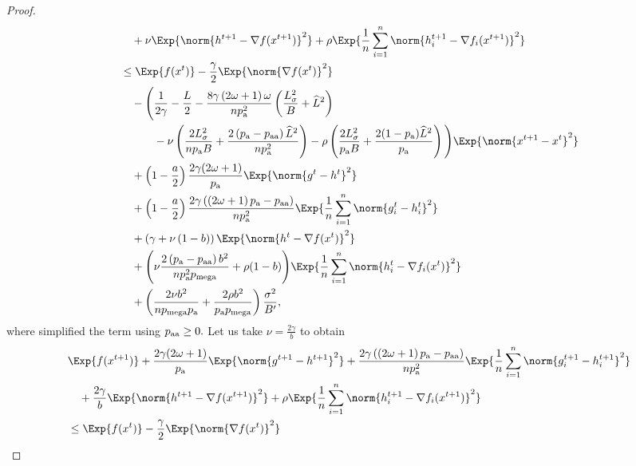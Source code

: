 \documentclass{article}
\newcommand*{\probavailable}{\ensuremath{p_{\textnormal{a}}}}
\newcommand*{\probpairaa}{\ensuremath{p_{\textnormal{aa}}}}
\newcommand*{\probmega}{\ensuremath{p_{\text{mega}}}}
\begin{document}
\begin{proof}
\begin{align*}
    &\quad  + \nu \Exp{\norm{h^{t+1} - \nabla f(x^{t+1})}^2} + \rho \Exp{\frac{1}{n}\sum_{i=1}^n\norm{h^{t+1}_i - \nabla f_i(x^{t+1})}^2}\\
    &\leq \Exp{f(x^t)} - \frac{\gamma}{2}\Exp{\norm{\nabla f(x^t)}^2} \\
    &\quad - \Bigg(\frac{1}{2\gamma} - \frac{L}{2} - \frac{8 \gamma \left(2 \omega + 1\right)\omega}{n \probavailable^2}\left(\frac{L_{\sigma}^2}{B} + \widehat{L}^2\right) \\
    &\qquad\quad - \nu \left(\frac{2 L_{\sigma}^2}{n \probavailable B} + \frac{2\left(\probavailable - \probpairaa\right) \widehat{L}^2}{n \probavailable^2}\right) - \rho \left(\frac{2 L_{\sigma}^2}{\probavailable B} + \frac{2(1 - \probavailable) \widehat{L}^2}{\probavailable}\right)\Bigg) \Exp{\norm{x^{t+1} - x^t}^2} \\
    &\quad + \left(1 - \frac{a}{2}\right)\frac{2\gamma(2\omega + 1)}{\probavailable} \Exp{\norm{g^{t} - h^{t}}^2} \\
    &\quad + \left(1 - \frac{a}{2}\right)\frac{2\gamma\left(\left(2 \omega + 1\right)\probavailable - \probpairaa\right)}{n \probavailable^2}\Exp{\frac{1}{n}\sum_{i=1}^n\norm{g^{t}_i - h^{t}_i}^2} \\
    &\quad + \left(\gamma + \nu \left(1 - b\right)\right) \Exp{\norm{h^{t} - \nabla f(x^{t})}^2} \\
    &\quad + \Bigg(\nu \frac{2\left(\probavailable - \probpairaa\right) b^2}{n \probavailable^2 \probmega} + \rho (1 - b)\Bigg)\Exp{\frac{1}{n}\sum_{i=1}^n\norm{h^{t}_i - \nabla f_i(x^{t})}^2} \\
    &\quad + \left(\frac{2 \nu b^2}{n \probmega \probavailable} + \frac{2 \rho b^2}{\probavailable \probmega}\right) \frac{\sigma^2}{B'},
  \end{align*}
  where simplified the term using $\probpairaa \geq 0.$ Let us take $\nu = \frac{2\gamma}{b}$ to obtain
  \begin{align*}
    &\Exp{f(x^{t + 1})} + \frac{2\gamma(2\omega + 1)}{\probavailable} \Exp{\norm{g^{t+1} - h^{t+1}}^2} + \frac{2\gamma\left(\left(2 \omega + 1\right)\probavailable - \probpairaa\right)}{n \probavailable^2} \Exp{\frac{1}{n}\sum_{i=1}^n\norm{g^{t+1}_i - h^{t+1}_i}^2}\\
    &\quad  + \frac{2\gamma}{b} \Exp{\norm{h^{t+1} - \nabla f(x^{t+1})}^2} + \rho \Exp{\frac{1}{n}\sum_{i=1}^n\norm{h^{t+1}_i - \nabla f_i(x^{t+1})}^2}\\
    &\leq \Exp{f(x^t)} - \frac{\gamma}{2}\Exp{\norm{\nabla f(x^t)}^2} \\

\end{align*}
\end{proof}
\end{document}
